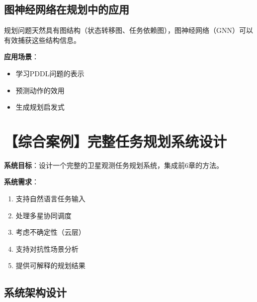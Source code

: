 \subsection{图神经网络在规划中的应用}

规划问题天然具有图结构（状态转移图、任务依赖图），图神经网络（GNN）可以有效捕获这些结构信息。

\textbf{应用场景}：
\begin{itemize}[leftmargin=2em]
  \item 学习PDDL问题的表示
  \item 预测动作的效用
  \item 生成规划启发式
\end{itemize}

\section{【综合案例】完整任务规划系统设计}

\begin{caseboxA}
\textbf{系统目标}：设计一个完整的卫星观测任务规划系统，集成前6章的方法。

\textbf{系统需求}：
\begin{enumerate}
  \item 支持自然语言任务输入
  \item 处理多星协同调度
  \item 考虑不确定性（云层）
  \item 支持对抗性场景分析
  \item 提供可解释的规划结果
\end{enumerate}
\end{caseboxA}

\subsection{系统架构设计}

